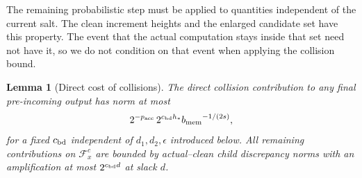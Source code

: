 \documentclass[11pt]{article}
\numberwithin{equation}{section}
\newtheorem{lemma}[theorem]{Lemma}
\theoremstyle{definition}
\theoremstyle{remark}
\begin{document}
The remaining probabilistic step must be applied to quantities independent of the current salt. The clean increment heights and the enlarged candidate set have this property. The event that the actual computation stays inside that set need not have it, so we do not condition on that event when applying the collision bound.

\begin{lemma}[Direct cost of collisions]\label{lem:fp-direct}
The direct collision contribution to any final pre-incoming output has
norm at most
\begin{equation}
             2^{-{p_{\rm acc}}}\,2^{{c_{\rm bd}} h_*}{b_{\rm mem}}^{-1/(2s)},
 \label{eq:fp-direct-charge}
\end{equation}
for a fixed ${c_{\rm bd}}$ independent of ${d}_1,{d}_2,\epsilon$ introduced below.
All remaining contributions on $\mathcal F_x^c$ are bounded by
actual--clean child discrepancy norms with an amplification at most
$2^{{c_{\rm bd}} d}$ at slack $d$.
\end{lemma}
\end{document}
